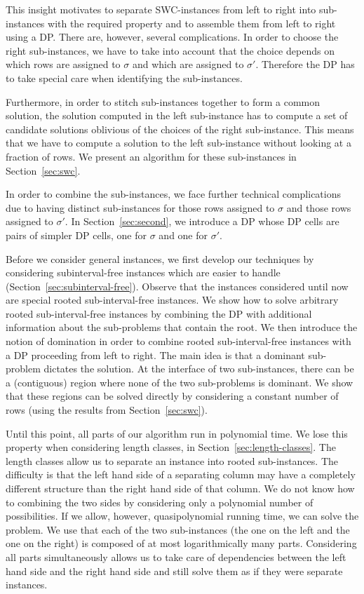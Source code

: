 This insight motivates to separate SWC-instances from left to right into sub-instances with the required property and to assemble them from left to right using a DP.
There are, however, several complications.
In order to choose the right sub-instances, we have to take into account that the choice depends on which rows are assigned to $\sigma$ and which are assigned to $\sigma'$.
Therefore the DP has to take special care when identifying the sub-instances.

Furthermore, in order to stitch sub-instances together to form a common solution, the solution computed in the left sub-instance has to compute a set of candidate solutions oblivious of the choices of the right sub-instance.
This means that we have to compute a solution to the left sub-instance without looking at a fraction of rows.
We present an algorithm for these sub-instances in Section~\ref{sec:swc}.

In order to combine the sub-instances, we face further technical complications due to having distinct sub-instances for those rows assigned to $\sigma$ and those rows assigned to $\sigma'$.
In Section~\ref{sec:second}, we introduce a DP whose DP cells are pairs of simpler DP cells, one for $\sigma$ and one for $\sigma'$.

Before we consider general instances, we first develop our techniques by considering subinterval-free instances which are easier to handle (Section~\ref{sec:subinterval-free}).
Observe that the instances considered until now are special rooted sub-interval-free instances.
We show how to solve arbitrary rooted sub-interval-free instances by combining the DP with additional information about the sub-problems that contain the root.
We then introduce the notion of domination in order to combine rooted sub-interval-free instances with a DP proceeding from left to right.
The main idea is that a dominant sub-problem dictates the solution.
At the interface of two sub-instances, there can be a (contiguous) region where none of the two sub-problems is dominant.
We show that these regions can be solved directly by considering a constant number of rows (using the results from Section~\ref{sec:swc}).

Until this point, all parts of our algorithm run in polynomial time.
We lose this property when considering length classes, in Section~\ref{sec:length-classes}.
The length classes allow us to separate an instance into rooted sub-instances.
The difficulty is that the left hand side of a separating column may have a completely different structure than the right hand side of that column.
We do not know how to combining the two sides by considering only a polynomial number of possibilities.
If we allow, however, quasipolynomial running time, we can solve the problem. 
We use that each of the two sub-instances (the one on the left and the one on the right) is composed of at most logarithmically many parts.
Considering all parts simultaneously allows us to take care of dependencies between the left hand side and the right hand side and still solve them as if they were separate instances.

